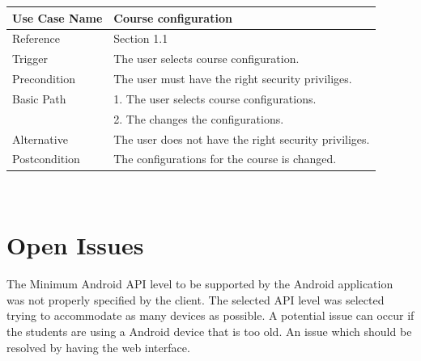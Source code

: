 \documentclass[10pt,a4paper]{article}
\begin{document}
                \begin{tabular}{|l|l|}\hline
                        Use Case Name   & Course configuration \\\hline
                        Reference & Section 1.1\\\hline
                        Trigger & The user selects course configuration.\\\hline
                        Precondition & The user must have the right security priviliges.\\\hline
                        Basic Path & 1.	The user selects course configurations. \\\linebreak &
                        2.	 The changes the configurations.\\\hline
                        Alternative & The user does not have the right security priviliges.\\\hline
                        Postcondition & The configurations for the course is changed.\\\hline
                \end{tabular}\\\linebreak
                
                
                
               
\pagebreak

\section{Open Issues}
The Minimum Android API level to be supported by the Android application was not properly specified by the client. The selected API level was selected trying to accommodate as many devices as possible. A potential issue can occur if the students are using a Android device that is too old. An issue which should be resolved by having the web interface.
\end{document}
